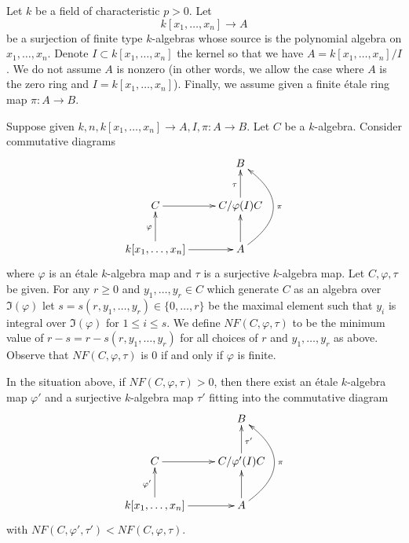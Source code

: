 \medskip\noindent
Let $k$ be a field of characteristic $p > 0$.
Let
$$
k[x_1, \ldots, x_n] \longrightarrow A
$$
be a surjection of finite type $k$-algebras whose source is the
polynomial algebra on $x_1, \ldots, x_n$. Denote
$I \subset k[x_1, \ldots, x_n]$ the kernel so that we have
$A = k[x_1, \ldots, x_n]/I$. We do not assume $A$ is nonzero
(in other words, we allow the case where $A$ is the zero ring
and $I = k[x_1, \ldots, x_n]$). Finally, we assume given a
finite \'etale ring map $\pi : A \to B$.

\medskip\noindent
Suppose given $k, n, k[x_1, \ldots, x_n] \to A, I, \pi : A \to B$.
Let $C$ be a $k$-algebra. Consider
commutative diagrams
$$
\xymatrix{
& B \\
C \ar[r] & C/\varphi(I)C \ar[u]^\tau \\
k[x_1, \ldots, x_n] \ar[u]^\varphi \ar[r] &
A \ar[u] \ar@/_3em/[uu]_\pi
}
$$
where $\varphi$ is an \'etale $k$-algebra map and $\tau$ is a
surjective $k$-algebra map.
Let $C, \varphi, \tau$ be given. For any $r \geq 0$ and
$y_1, \ldots, y_r \in C$ which generate $C$ as an algebra over
$\Im(\varphi)$ let $s = s(r, y_1, \ldots, y_r) \in \{0, \ldots, r\}$
be the maximal element such that $y_i$ is integral over $\Im(\varphi)$
for $1 \leq i \leq s$. We define $NF(C, \varphi, \tau)$
to be the minimum value of
$r - s = r - s(r, y_1, \ldots, y_r)$ for all choices of
$r$ and $y_1, \ldots, y_r$ as above.
Observe that $NF(C, \varphi, \tau)$ is $0$ if and only if $\varphi$ is finite.

\begin{lemma}
\label{lemma-lower-invariant}
In the situation above, if $NF(C, \varphi, \tau) > 0$, then there exist
an \'etale $k$-algebra map $\varphi'$ and a surjective $k$-algebra map
$\tau'$ fitting into the commutative diagram
$$
\xymatrix{
& B \\
C \ar[r] & C/\varphi'(I)C \ar[u]_{\tau'} \\
k[x_1, \ldots, x_n] \ar[u]^{\varphi'} \ar[r] &
A \ar[u] \ar@/_3em/[uu]_\pi
}
$$
with $NF(C, \varphi', \tau') < NF(C, \varphi, \tau)$.
\end{lemma}

